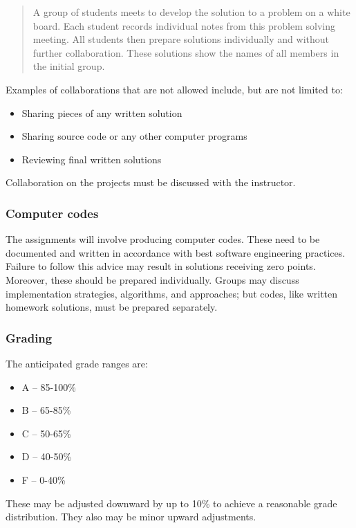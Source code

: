 \documentclass{article}
\begin{document}
\begin{quote}%
A group of students meets to develop the solution to a problem on a white board. Each student records individual notes from this problem solving meeting. All students then prepare solutions individually and without further collaboration. These solutions show the names of all members in the initial group.


\end{quote}
Examples of collaborations that are not allowed include, but are not limited to:

\begin{itemize}%
\item Sharing pieces of any written solution
\item Sharing source code or any other computer programs
\item Reviewing final written solutions

\end{itemize}
Collaboration on the projects must be discussed with the instructor.

\hypertarget{computer_codes_20}{}\subsubsection*{{Computer codes}}\label{computer_codes_20}

The assignments will involve producing computer codes. These need to be documented and written in accordance with best software engineering practices. Failure to follow this advice may result in solutions receiving zero points. Moreover, these should be prepared individually. Groups may discuss implementation strategies, algorithms, and approaches; but codes, like written homework solutions, must be prepared separately.

\hypertarget{grading_21}{}\subsubsection*{{Grading}}\label{grading_21}

The anticipated grade ranges are:

\begin{itemize}%
\item A --{} 85-100\%
\item B --{} 65-85\%
\item C --{} 50-65\%
\item D --{} 40-50\%
\item F --{} 0-40\%

\end{itemize}
These may be adjusted downward by up to 10\% to achieve a reasonable grade distribution. They also may be minor upward adjustments.
\end{document}

